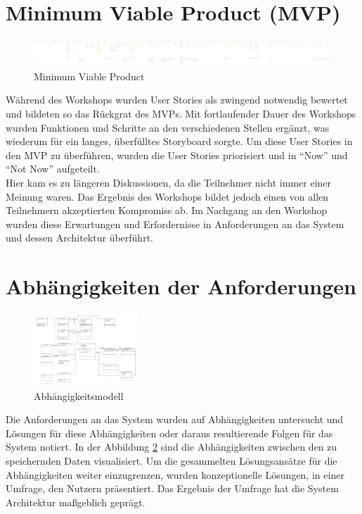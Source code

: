 \section{Minimum Viable Product (MVP)}
\begin{figure}[h] %
    \includegraphics[width=1\textwidth]{images/mvp.png}
    \caption[Minimum Viable Product]{Minimum Viable Product}
    \label{fig:mvp}
\end{figure}
Während des Workshops wurden User Stories als zwingend notwendig bewertet und bildeten so das Rückgrat des MVPs. Mit fortlaufender Dauer des Workshops wurden Funktionen und Schritte an den verschiedenen Stellen ergänzt, was wiederum für ein langes, überfülltes Storyboard sorgte. Um diese User Stories in den MVP zu überführen, wurden die User Stories priorisiert und in {``Now''} und {``Not Now''} aufgeteilt.\\ 
Hier kam es zu längeren Diskussionen, da die Teilnehmer nicht immer einer Meinung waren. Das Ergebnis des Workshops bildet jedoch einen von allen Teilnehmern akzeptierten Kompromiss ab. Im Nachgang an den Workshop wurden diese Erwartungen und Erfordernisse in Anforderungen an das System und dessen Architektur überführt.\\

\section{Abhängigkeiten der Anforderungen}
\begin{figure}
    \centering
    \includegraphics[width=0.35\textwidth]{images/dependencymodell.png}
    \caption[Abhängigkeitsmodell]{Abhängigkeitsmodell}
    \label{fig:dependencymodell}
\end{figure}
Die Anforderungen an das System wurden auf Abhängigkeiten untersucht und Lösungen für diese Abhängigkeiten oder daraus resultierende Folgen für das System notiert. In der Abbildung \ref{fig:dependencymodell} sind die Abhängigkeiten zwischen den zu speichernden Daten visualisiert. Um die gesammelten Lösungsansätze für die Abhängigkeiten weiter einzugrenzen, wurden konzeptionelle Lösungen, in einer Umfrage, den Nutzern präsentiert. Das Ergebnis der Umfrage hat die System Architektur maßgeblich geprägt.\\
\\

